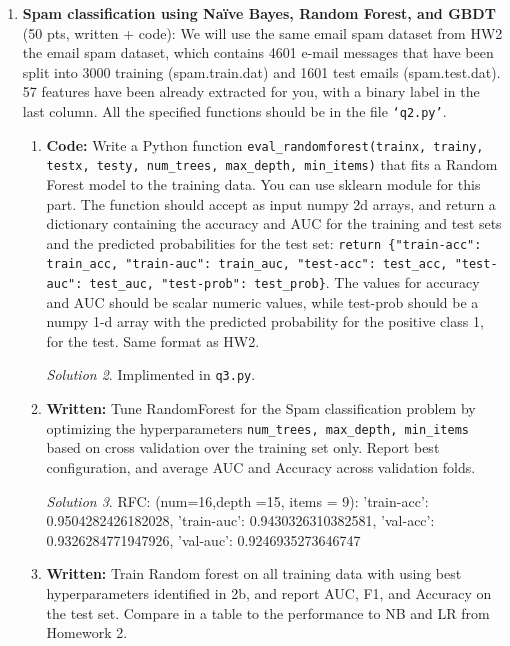 \documentclass[a4paper,12pt]{article}
\theoremstyle{definition}
\theoremstyle{remark}
\newtheorem*{solution}{Solution}
\begin{document}
\begin{enumerate}
\begin{enumerate}
\begin{solution}
\begin{figure}
\begin{minipage}{0.49\textwidth}
					\caption{Decision Tree I}
				\end{minipage}
				\end{figure}
			\end{solution}
		\end{enumerate}
		\item {\bf Spam classification using Naïve Bayes, Random Forest, and GBDT} (50  pts, written + code):
		We will use the same email spam dataset from HW2 the email spam dataset, which contains 4601 e-mail messages
		that have been split into 3000 training (spam.train.dat) and 1601 test emails (spam.test.dat). 57 features have been
		already extracted for you, with a binary label in the last column.
		All the specified functions should be in the file \texttt{‘q2.py’}.
		\begin{enumerate}
			\item {\bf Code:} Write a Python function {\tt eval\_randomforest(trainx, trainy, testx, testy, num\_trees, max\_depth, min\_items)} that fits a Random Forest model to the training data. You can use sklearn module for this part. The
			function should accept as input numpy 2d arrays, and return a dictionary containing the accuracy and AUC for the
			training and test sets and the predicted probabilities for the test set: {\tt return \{"train-acc": train\_acc, "train-auc":
				train\_auc, "test-acc": test\_acc, "test-auc": test\_auc, "test-prob": test\_prob\}}. The values for accuracy and AUC should be scalar numeric values, while test-prob should be a numpy 1-d array with the predicted probability for the positive class 1, for the test. Same format as HW2.
			\begin{solution}
				 Implimented in \texttt{q3.py}.
			\end{solution}
			\item  {\bf Written:} Tune RandomForest for the Spam classification problem by optimizing the hyperparameters
			{\tt num\_trees, max\_depth, min\_items} based on cross validation over the training set only. Report best configuration,
			and average AUC and Accuracy across validation folds.
			\begin{solution}
				RFC: (num=16,depth =15, items = 9):
				{'train-acc': 0.9504282426182028, 'train-auc': 0.9430326310382581, 'val-acc': 0.9326284771947926, 'val-auc': 0.9246935273646747}
			\end{solution}
			\item {\bf Written:} Train Random forest on all training data with using best hyperparameters identified in 2b, and report
			AUC, F1, and Accuracy on the test set. Compare in a table to the performance to NB and LR from Homework 2.

\end{enumerate}
\end{enumerate}
\end{document}
